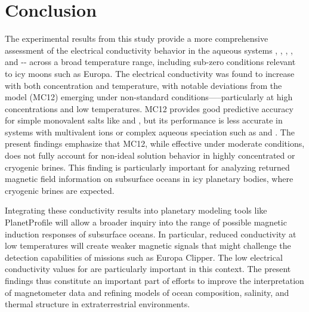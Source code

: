 \documentclass[journal=aesccq,manuscript=article]{achemso}
\begin{document}
\section{Conclusion}

The experimental results from this study provide a more comprehensive assessment of the electrical conductivity behavior in the aqueous systems , , , , and -- across a broad temperature range, including sub-zero conditions relevant to icy moons such as Europa. 
The electrical conductivity was found to increase with both concentration and temperature, with notable deviations from the \citet{McCleskey2012} model (MC12) emerging under non-standard conditions—--particularly at high concentrations and low temperatures.
MC12 provides good predictive accuracy for simple monovalent salts like  and , but its performance is less accurate in systems with multivalent ions or complex aqueous speciation such as  and .
The present findings emphasize that MC12, while effective under moderate conditions, does not fully account for non-ideal solution behavior in highly concentrated or cryogenic brines. 
This finding is particularly important for analyzing returned magnetic field information on subsurface oceans in icy planetary bodies, where cryogenic brines are expected.

Integrating these conductivity results into planetary modeling tools like PlanetProfile\cite{vance2018geophysical} will allow a broader inquiry into the range of possible magnetic induction responses of subsurface oceans. 
In particular, reduced conductivity at low temperatures will create weaker magnetic signals that might challenge the detection capabilities of missions such as Europa Clipper.
The low electrical conductivity values for  are particularly important in this context.
The present findings thus constitute an important part of efforts to improve the interpretation of magnetometer data and refining models of ocean composition, salinity, and thermal structure in extraterrestrial environments.
\end{document}
